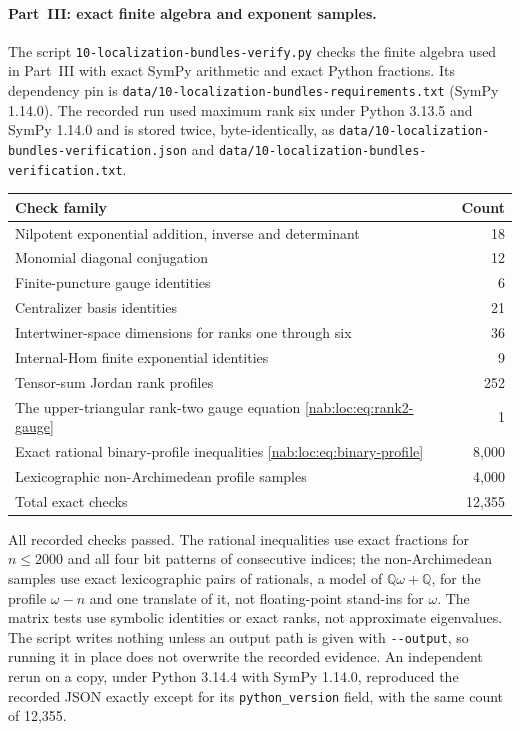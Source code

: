 \documentclass[11pt,letterpaper]{article}
\theoremstyle{definition}
\theoremstyle{remark}
\newcommand{\Q}{\mathbb Q}
\numberwithin{equation}{section}
\begin{document}
\paragraph{Part~III: exact finite algebra and exponent samples.}
The script \nolinkurl{10-localization-bundles-verify.py} checks the finite
algebra used in Part~III with exact SymPy arithmetic and exact Python
fractions. Its dependency pin is
\nolinkurl{data/10-localization-bundles-requirements.txt} (SymPy 1.14.0). The
recorded run used maximum rank six under Python 3.13.5 and SymPy 1.14.0 and is
stored twice, byte-identically, as
\nolinkurl{data/10-localization-bundles-verification.json} and
\nolinkurl{data/10-localization-bundles-verification.txt}.
\begin{center}\small
\begin{tabular}{@{}L{0.71\textwidth}r@{}}
\toprule
Check family & Count\\
\midrule
Nilpotent exponential addition, inverse and determinant & 18\\
Monomial diagonal conjugation & 12\\
Finite-puncture gauge identities & 6\\
Centralizer basis identities & 21\\
Intertwiner-space dimensions for ranks one through six & 36\\
Internal-Hom finite exponential identities & 9\\
Tensor-sum Jordan rank profiles & 252\\
The upper-triangular rank-two gauge equation \eqref{nab:loc:eq:rank2-gauge} & 1\\
Exact rational binary-profile inequalities \eqref{nab:loc:eq:binary-profile} & 8{,}000\\
Lexicographic non-Archimedean profile samples & 4{,}000\\
\midrule
Total exact checks & 12{,}355\\
\bottomrule
\end{tabular}
\end{center}
All recorded checks passed. The rational inequalities use exact fractions for
$n\leq2000$ and all four bit patterns of consecutive indices; the
non-Archimedean samples use exact lexicographic pairs of rationals, a model of
$\Q\omega+\Q$, for the profile $\omega-n$ and one translate of it, not
floating-point stand-ins for $\omega$. The matrix tests use symbolic identities
or exact ranks, not approximate eigenvalues. The script writes nothing unless
an output path is given with \texttt{-{}-output}, so running it in place does
not overwrite the recorded evidence. An independent rerun on a copy, under
Python 3.14.4 with SymPy 1.14.0, reproduced the recorded JSON exactly except
for its \texttt{python\_version} field, with the same count of 12{,}355.
\end{document}
